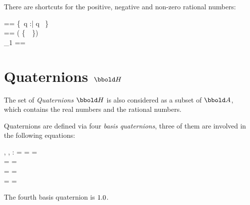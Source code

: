 \documentclass[12pt]{article}
\begin{document}
There are shortcuts for the positive, negative and non-zero rational numbers:
\begin{zed}
  \ratplus == \{~q :\rat | q \agt \azero~\}\\
  \ratminus == \rat \setminus ( \ratplus \cup \{~\azero~\}) \\
  \rat_1 == \ratplus \cup \ratminus \\
\end{zed}
%
\section{Quaternions $\quaternions$}
\label{sec:quaternions}
The set of \emph{Quaternions} $\quaternions$ is also considered as a
subset of $\arithmos$, which contains the real numbers and the
rational numbers.

Quaternions are defined via four \emph{basis quaternions}, three of
them are involved in the following equations:
%
\begin{axdef}
  \iu, \ju, \ku : \arithmos
  \where
  \iu \amult \iu = \ju \amult \ju = \ku \amult \ku = \aneg \aone\\
  \iu \amult \ju = \aneg \ju \amult \iu = \ku \\
  \ju \amult \ku = \aneg \ku \amult \ju = \iu \\
  \ku \amult \iu = \aneg \iu \amult \ku = \ju
\end{axdef}

The fourth basis quaternion is $1.0$.
\end{document}
